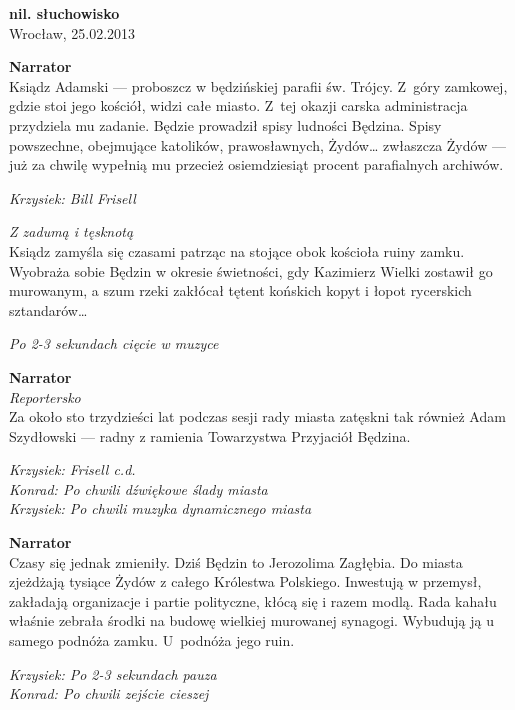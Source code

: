 \documentclass[11pt,a4paper,oneside]{article}
\begin{document}
\noindent
\textbf{nil. słuchowisko}\\
Wrocław, 25.02.2013

\textbf{Narrator}\\
Ksiądz Adamski --- proboszcz w będzińskiej parafii św. Trójcy.  Z~góry
zamkowej, gdzie stoi jego kościół, widzi całe miasto.  Z~tej okazji
carska administracja przydziela mu zadanie. Będzie prowadził spisy
ludności Będzina.  Spisy powszechne, obejmujące  katolików, prawosławnych, Żydów\dots{} zwłaszcza
Żydów --- już za chwilę wypełnią mu przecież osiemdziesiąt procent
parafialnych archiwów. 

{\color{krzysiek} \emph{Krzysiek: Bill Frisell}}

{\color{light-gray} \emph{Z zadumą i tęsknotą}} \\
Ksiądz zamyśla się czasami patrząc na stojące obok kościoła ruiny
zamku.  Wyobraża sobie Będzin w okresie świetności, gdy Kazimierz
Wielki zostawił go murowanym, a szum rzeki zakłócał tętent końskich
kopyt i łopot rycerskich sztandarów\dots{}

{\color{light-gray} \emph{Po 2-3 sekundach cięcie w muzyce}}

\textbf{Narrator}\\
{\color{light-gray} \emph{Reportersko}}\\
Za około sto trzydzieści lat podczas sesji rady miasta zatęskni tak również Adam
Szydłowski --- radny z ramienia Towarzystwa Przyjaciół Będzina.

{\color{krzysiek} \emph{Krzysiek: Frisell c.d.}}\\
{\color{konrad} \emph{Konrad: Po chwili dźwiękowe ślady miasta}}\\
{\color{krzysiek} \emph{Krzysiek: Po chwili muzyka dynamicznego miasta}}

\textbf{Narrator}\\
Czasy się jednak zmieniły. Dziś Będzin to Jerozolima Zagłębia.  Do
miasta zjeżdżają tysiące Żydów z całego Królestwa Polskiego.
Inwestują w przemysł, zakładają organizacje i partie polityczne, kłócą
się i razem modlą.  Rada kahału właśnie zebrała środki na budowę
wielkiej murowanej synagogi. Wybudują ją u samego podnóża zamku.
U~podnóża jego ruin.

{\color{krzysiek} \emph{Krzysiek: Po 2-3 sekundach pauza}}\\
{\color{konrad}   \emph{Konrad: Po chwili zejście cieszej}}
\end{document}
